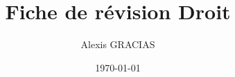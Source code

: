 \documentclass[12pt,french, a4paper]{report}
\title{\Huge Fiche de révision Droit}
\author{\LARGE Alexis GRACIAS}
\date{\Large \today}
\begin{document}
\maketitle
\Large \tableofcontents







\end{document}
